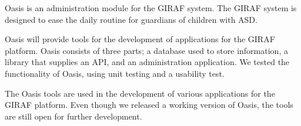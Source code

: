 Oasis is an administration module for the GIRAF system. The GIRAF system is designed to 
ease the daily routine for guardians of children with ASD. 

Oasis will provide tools for the development of applications for the GIRAF platform. Oasis consists of three parts; a database used to store information, a library that supplies an API, and an administration application. We tested the functionality of Oasis, using unit testing and a usability test. 

The Oasis tools are used in the development of various applications for the GIRAF platform. Even though we released a working version of Oasis, the tools are still open for further development.